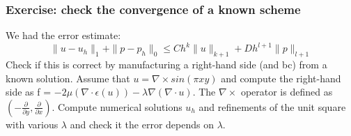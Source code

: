 \begin{frame}
\frametitle{Exercise: check the convergence of a known scheme}

We had the error estimate: 
\[
\| u - u_h \|_1 +  \| p - p_h \|_0 \leqslant C h^k \| u  \|_{k+1} +  D h^{l+1} \| p \|_{l+1}
\]
Check if this is correct by manufacturing a right-hand side (and bc) 
from a known solution. 
Assume that $u=\nabla\times sin(\pi x y)$ 
and  compute the right-hand side
as 
f = $-2 \mu (\nabla \cdot \epsilon (u)) - \lambda \nabla (\nabla \cdot u)$. 
The $\nabla\times$ operator is defined as $(-\frac{\partial}{\partial y}, \frac{\partial}{\partial x})$.
Compute numerical solutions
$u_h$ and refinements of the unit square with various $\lambda$ and check 
it the error depends on $\lambda$.    




\end{frame}
